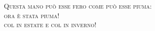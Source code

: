 \thispagestyle{empty}
\begin{center}
\large\textsc{Questa mano può esse fero come può esse piuma:\\ {\LARGE ora è stata piuma!}\\
\vspace{5cm}
 col  in estate e  col  in inverno!}
\end{center}